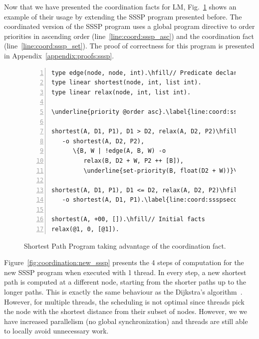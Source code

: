 Now that we have presented the coordination facts for LM,
Fig.~\ref{code:shortest_path_program_coord} shows an example of their usage by
extending the SSSP program presented before. The coordinated version of the SSSP
program uses a global program directive to order priorities in ascending order
(line~\ref{line:coord:sssp_asc}) and the coordination fact 
(line~\ref{line:coord:sssp_set}). The proof of correctness for this program is
presented in Appendix~\ref{appendix:proofs:sssp}.

\begin{figure}[ht]
\begin{Verbatim}[numbers=left,commandchars=\\\{\},fontsize=\codesize]
type edge(node, node, int).\hfill// Predicate declaration
type linear shortest(node, int, list int).
type linear relax(node, int, list int).

\underline{priority @order asc}.\label{line:coord:sssp_asc}

shortest(A, D1, P1), D1 > D2, relax(A, D2, P2)\hfill// Rule 1: newly improved path\label{line:coord:ssspfirst1}
   -o shortest(A, D2, P2),
      \{B, W | !edge(A, B, W) -o
         relax(B, D2 + W, P2 ++ [B]),
         \underline{set-priority(B, float(D2 + W))}\}.\label{line:coord:sssp_set}\label{line:coord:ssspfirst2}

shortest(A, D1, P1), D1 <= D2, relax(A, D2, P2)\hfill// Rule 2: longer path\label{line:coord:ssspsecond1}
   -o shortest(A, D1, P1).\label{line:coord:ssspsecond2}

shortest(A, +00, []).\hfill// Initial facts
relax(@1, 0, [@1]).
\end{Verbatim}
   \caption{Shortest Path Program taking advantage of the 
   coordination fact.}
   \label{code:shortest_path_program_coord}
\end{figure}

Figure~\ref{fig:coordination:new_sssp} presents the 4 steps of computation for
the new SSSP program when executed with 1 thread. In every step, a new shortest
path is computed at a different node, starting from the shorter paths up to the
longer paths. This is exactly the same behaviour as the Dijkstra's
algorithm~\cite{Dijkstra}.  However, for multiple threads, the scheduling is not
optimal since threads pick the node with the shortest distance from their subset
of nodes. However, we we have increased parallelism (no global synchronization)
and threads are still able to locally avoid unnecessary work.

